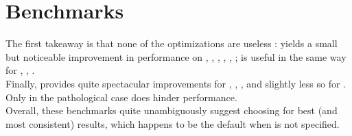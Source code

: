 \section{Benchmarks}

\begin{center}\label{bench-results}

\end{center}

The first takeaway is that none of the optimizations are useless :
 yields a small but noticeable improvement in performance on
, , , , , ;
 is useful in the same way for , , .\\
Finally,  provides quite spectacular improvements for ,
, ,  and slightly less so for .
Only in the pathological case  does  hinder performance.\\

Overall, these benchmarks quite unambiguously suggest choosing  for best
(and most consistent) results, which happens to be the default when  is not
specified.\\

